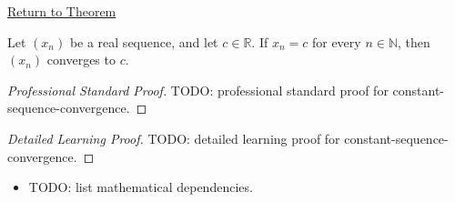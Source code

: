\newpage
{}
\label{prf:constant-sequence-convergence}

\begin{remark*}[Return]
\hyperref[thm:constant-sequence-convergence]{Return to Theorem}
\end{remark*}

\begin{theorem*}
Let $(x_n)$ be a real sequence, and let $c \in \mathbb{R}$. If $x_n = c$
for every $n \in \mathbb{N}$, then $(x_n)$ converges to $c$.

\smallskip
\noindent
\end{theorem*}

\begin{proof}[Professional Standard Proof]
\LRAProofBodyStart
TODO: professional standard proof for constant-sequence-convergence.
\end{proof}

\begin{proof}[Detailed Learning Proof]
\LRAProofBodyStart
TODO: detailed learning proof for constant-sequence-convergence.
\end{proof}

\begin{remark*}
\end{remark*}

\begin{dependencies}
\begin{itemize}
  \item TODO: list mathematical dependencies.
\end{itemize}
\end{dependencies}

\clearpage
